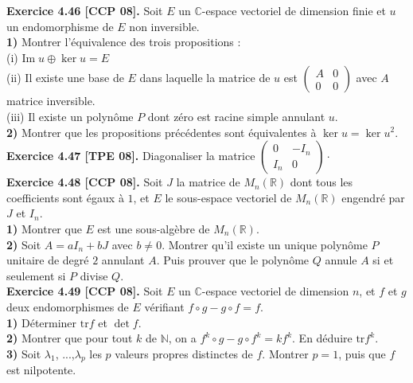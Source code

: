 \documentclass[a4paper,12pt,francais]{article}
\newcommand{\field}[1]{\mathbb{#1}}
\newcommand{\N}{\field{N}}
\newcommand{\R}{\field{R}}
\newcommand{\C}{\field{C}}
\newcommand{\im}{\mbox{Im}}
\newcommand{\tr}{\mbox{tr}}
\begin{document}
\noindent
{\bf Exercice 4.46 [CCP 08].} Soit $E$ un $\C$-espace vectoriel de dimension finie et $u$ un endomorphisme de $E$ non inversible.\\
{\bf 1)} Montrer l'équivalence des trois propositions :\\
\indent
 (i) $\im \; u \oplus \ker u = E$\\
\indent
(ii) Il existe une base de $E$ dans laquelle la matrice de $u$ est  
$\displaystyle \left( {\begin{array}{cc} 
A& 0\\
0&0  \end{array} }\right)$ avec $A$ matrice inversible.\\
\indent
(iii) Il existe un polynôme $P$ dont zéro est racine simple annulant $u$.\\
{\bf 2)} Montrer que les propositions précédentes sont équivalentes à $\ker u =\ker u^2$.\\

\noindent
{\bf Exercice 4.47 [TPE 08].} Diagonaliser la matrice $\displaystyle 
\left({\begin{array}{cc}
0&-I_n\\
I_n&0 \end{array} } \right)\cdot$\\

\noindent
{\bf Exercice 4.48 [CCP 08].} Soit $J$ la matrice de $M_n(\R)$ dont tous les coefficients sont égaux à $1$, et $E$ le sous-espace vectoriel de $M_n(\R)$ engendré par $J$ et $I_n$.\\
\indent
{\bf 1)} Montrer que $E$ est une sous-algèbre de $M_n(\R)$.\\
\indent
{\bf 2)} Soit $A=aI_n+bJ$ avec $b\neq 0$. Montrer qu'il existe un unique polynôme $P$ unitaire de degré $2$ annulant $A$. Puis prouver que le polynôme $Q$ annule $A$ si et seulement si $P$ divise $Q$.\\

\noindent
{\bf Exercice 4.49 [CCP 08].} Soit $E$ un $\C$-espace vectoriel de dimension $n$, et $f$ et $g$ deux endomorphismes de $E$ vérifiant $f\circ g-g\circ f=f$.\\
\indent
{\bf 1)} Déterminer $\tr f$ et  $\det f$.\\
\indent
{\bf 2)} Montrer que pour tout $k$ de $\N$, on a $f^k \circ g -g \circ f^k =k f^k$. En déduire $\tr f^k$.\\
\indent
{\bf 3)} Soit $\lambda_1$, ...,$\lambda_p$ les $p$ valeurs propres distinctes de $f$. Montrer $p=1$, puis que $f$ est nilpotente.\\
\end{document}
